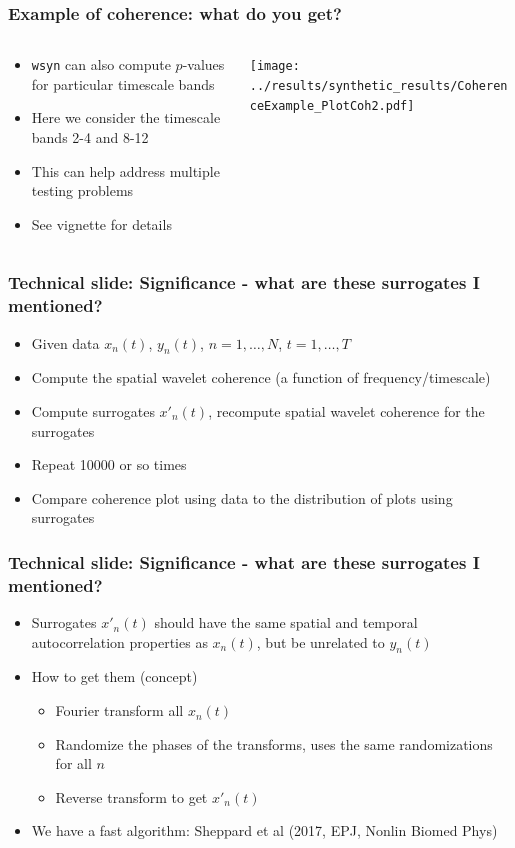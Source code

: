 \documentclass{beamer}
\begin{document}
\begin{frame}[fragile]
\frametitle{Example of coherence: what do you get?}
\begin{columns}[c]
\begin{column}{4cm}
\begin{itemize}
\item \texttt{wsyn} can also compute $p$-values for particular timescale bands
\item Here we consider the timescale bands 2-4 and 8-12
\item This can help address multiple testing problems
\item See vignette for details
\end{itemize}
\end{column}
\begin{column}{8cm}
\texttt{[image: ../results/synthetic\_results/CoherenceExample\_PlotCoh2.pdf]}
\end{column}
\end{columns}
\end{frame}

\begin{frame}
\frametitle{Technical slide: Significance - what are these surrogates I mentioned?}
\begin{itemize}
\item Given data $x_n(t)$, $y_n(t)$, $n=1,\ldots,N$, $t=1,\ldots,T$
\item Compute the spatial wavelet coherence (a function of frequency/timescale)
\item Compute surrogates $x'_n(t)$, recompute spatial wavelet coherence for the surrogates
\item Repeat 10000 or so times
\item Compare coherence plot using data to the distribution of plots using surrogates
\end{itemize}
\end{frame}

\begin{frame}
\frametitle{Technical slide: Significance - what are these surrogates I mentioned?}
\begin{itemize}
\item Surrogates $x'_n(t)$ should have the same spatial and temporal autocorrelation properties as $x_n(t)$, but be unrelated to $y_n(t)$
\item How to get them (concept)
\begin{itemize}
\item Fourier transform all $x_n(t)$
\item Randomize the phases of the transforms, uses the same randomizations for all $n$
\item Reverse transform to get $x'_n(t)$
\end{itemize}
\item We have a fast algorithm: Sheppard et al (2017, EPJ, Nonlin Biomed Phys)
\end{itemize}
\end{frame}
\end{document}
